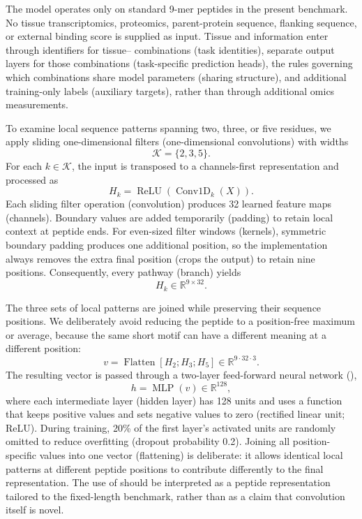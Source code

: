 The model operates only on standard 9-mer peptides in the present benchmark. No tissue transcriptomics, proteomics, parent-protein sequence, flanking sequence, or external binding score is supplied as input. Tissue and \plainHLA{} information enter through identifiers for tissue--\plainHLA{} combinations (task identities), separate output layers for those combinations (task-specific prediction heads), the rules governing which combinations share model parameters (sharing structure), and additional training-only labels (auxiliary targets), rather than through additional omics measurements.

To examine local sequence patterns spanning two, three, or five residues, we apply sliding one-dimensional filters (one-dimensional convolutions) with widths
\[
\mathcal{K}=\{2,3,5\}.
\]
For each \(k\in\mathcal{K}\), the input is transposed to a channels-first representation and processed as
\[
H_k
=
\operatorname{ReLU}
\left(
\operatorname{Conv1D}_{k}(X)
\right).
\]
Each sliding filter operation (convolution) produces 32 learned feature maps (channels). Boundary values are added temporarily (padding) to retain local context at peptide ends. For even-sized filter windows (kernels), symmetric boundary padding produces one additional position, so the implementation always removes the extra final position (crops the output) to retain nine positions. Consequently, every pathway (branch) yields
\[
H_k\in\mathbb{R}^{9\times 32}.
\]

The three sets of local patterns are joined while preserving their sequence positions. We deliberately avoid reducing the peptide to a position-free maximum or average, because the same short motif can have a different meaning at a different position:
\[
v
=
\operatorname{Flatten}
\left[
H_2;H_3;H_5
\right]
\in\mathbb{R}^{9\cdot32\cdot3}.
\]
The resulting vector is passed through a two-layer feed-forward neural network (\plainMLP{}),
\[
h
=
\operatorname{MLP}(v)
\in\mathbb{R}^{128},
\]
where each intermediate layer (hidden layer) has 128 units and uses a function that keeps positive values and sets negative values to zero (rectified linear unit; ReLU). During training, 20\% of the first layer's activated units are randomly omitted to reduce overfitting (dropout probability 0.2). Joining all position-specific values into one vector (flattening) is deliberate: it allows identical local patterns at different peptide positions to contribute differently to the final representation. The use of \plainMultiKernel{} should be interpreted as a peptide representation tailored to the fixed-length benchmark, rather than as a claim that convolution itself is novel.

